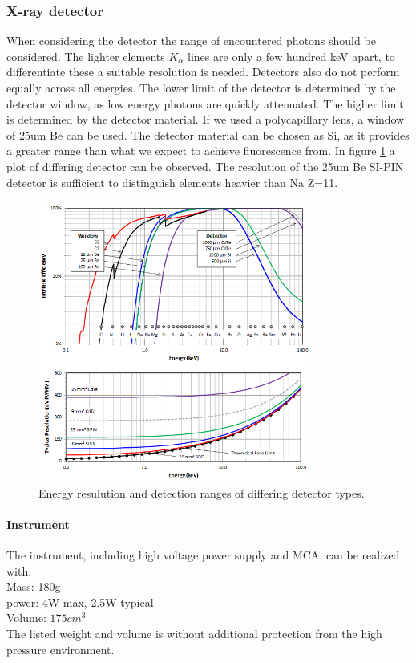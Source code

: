 \subsubsection{X-ray detector}
When considering the detector the range of encountered photons should be considered. The lighter elements $K_\alpha$ lines are only a few hundred keV apart, to differentiate these a suitable resolution is needed. Detectors also do not perform equally across all energies. The lower limit of the detector is determined by the detector window, as low energy photons are quickly attenuated. The higher limit is determined by the detector material. If we used a polycapillary lens, a window of 25um Be can be used. The detector material can be chosen as Si, as it provides a greater range than what we expect to achieve fluorescence from. In figure \ref{fig:AmptekDetector} a plot of differing detector can be observed. The resolution of the 25um Be SI-PIN detector is sufficient to distinguish elements heavier than Na Z=11.

\begin{figure}[h]
	\centering
	\includegraphics[width=0.8\textwidth]{figures/XRF/EnergyRes.png}
	\caption{Energy resulution and detection ranges of differing detector types.\cite{AmptekDetector}}
	\label{fig:AmptekDetector}
\end{figure}

\paragraph{Instrument}
The instrument, including high voltage power supply and MCA, can be realized with\citep{AmptekDetector}:\\
Mass: 180g\\
power: 4W max, 2.5W typical\\
Volume: $175cm^{3}$\\
The listed weight and volume is without additional protection from the high pressure environment.


